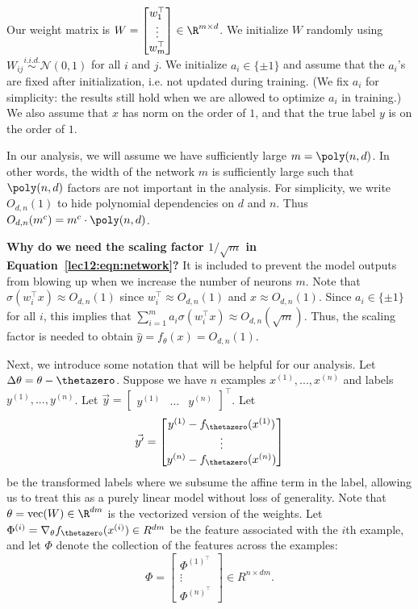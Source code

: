 Our weight matrix is $W = \begin{bmatrix} w_1^\top \\ \vdots \\ w_m^\top \end{bmatrix} \in \R^{m \times d}$. We initialize $W$ randomly using $W_{ij} \stackrel{i.i.d.}{\sim} \mathcal{N}(0, 1)$ for all $i$ and $j$. We initialize $a_i \in \{\pm 1\}$ and assume that the $a_i$'s are fixed after initialization, i.e. not updated during training. (We fix $a_i$ for simplicity: the results still hold when we are allowed to optimize $a_i$ in training.) We also assume that $x$ has norm on the order of $1$, and that the true label $y$ is on the order of $1$.

In our analysis, we will assume we have sufficiently large $m = \poly(n, d)$. In other words, the width of the network $m$ is sufficiently large such that $\poly(n, d)$ factors are not important in the analysis. For simplicity, we write $O_{d,n}(1)$ to hide polynomial dependencies on $d$ and $n$. Thus $O_{d,n}(m^c) = m^c \cdot \poly(n, d)$.

\textbf{Why do we need the scaling factor $1 / \sqrt{m}$ in Equation~\eqref{lec12:eqn:network}?} It is included to prevent the model outputs from blowing up when we increase the number of neurons $m$. Note that $\sigma (w_i^\top x) \approx O_{d,n}(1)$ since $w_i^\top \approx O_{d,n}(1)$ and $x \approx O_{d,n}(1)$. Since $a_i \in \{ \pm 1\}$ for all $i$, this implies that $ \sum_{i=1}^m a_i \sigma (w_i^\top x) \approx O_{d,n}(\sqrt{m})$. Thus, the scaling factor is needed to obtain $\hat{y} = f_\theta(x) = O_{d,n}(1)$.

Next, we introduce some notation that will be helpful for our analysis. Let $\Delta \theta = \theta - \thetazero$. Suppose we have $n$ examples $x^{(1)},...,x^{(n)}$ and labels $y^{(1)},...,y^{(n)}$. Let $\vec{y} = \begin{bmatrix} y^{(1)} & \dots & y^{(n)} \end{bmatrix}^\top$. Let
\begin{equation}
\vec{y'} = \begin{bmatrix} y^{(1)}-f_{\thetazero}(x^{(1)}) \\ \vdots \\ y^{(n)}-f_{\thetazero}(x^{(n)}) \end{bmatrix}
\end{equation}
be the transformed labels where we subsume the affine term in the label, allowing us to treat this as a purely linear model without loss of generality. Note that $\theta = \text{vec}(W) \in \R^{dm}$ is the vectorized version of the weights. Let $\Phi^{(i)} = \nabla_\theta f_{\thetazero}(x^{(i)}) \in R^{dm}$ be the feature associated with the $i$th example, and let $\Phi$ denote the collection of the features across the examples:
\begin{equation}
\Phi = \begin{bmatrix} \Phi^{(1)^\top} \\ \vdots \\ \Phi^{(n)^\top} \end{bmatrix} \in R^{n \times dm}.
\end{equation}

